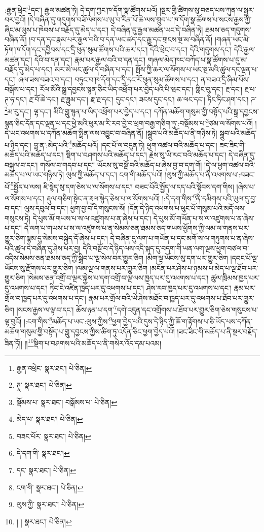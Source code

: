 :རྒྱན་ཕྲེང་\footnote{རྒྱན་འཕྲེང་  སྣར་ཐང་།  པེ་ཅིན། }དང་། རྒྱལ་མཚན་ཏེ། དེ་དག་ཀྱང་ཁ་དོག་སྣ་ཚོགས་པའོ། །སྔར་གྱི་ཚིགས་སུ་བཅད་པས་ཀུན་ལ་སྦྱར་བར་བྱའོ། །དེ་བཞིན་དུ་གདུགས་བཟོ་ལེགས་པ་ཡུ་བ་རིན་པོ་ཆེ་ལས་གྲུབ་པ་ཁ་དོག་སྣ་ཚོགས་པ་སངས་རྒྱས་ཀྱི་ཞིང་མ་ལུས་པ་ཁེབས་པ་བརྗོད་དུ་མེད་པ་དང་། དེ་བཞིན་དུ་རྒྱལ་མཚན་ཡང་དེ་བཞིན་ཏེ། ཐམས་ཅད་གདུགས་བཞིན་ནོ། །བ་དན་དང་རྣམ་པར་རྒྱལ་བའི་བ་དན་ཡང་ཚད་དང་རྒྱུ་དང་གྲངས་སྔ་མ་བཞིན་ནོ། །གཞན་ཡང་མེ་ཏོག་ཁ་དོག་དང་དབྱིབས་དང་དྲི་ཕུན་སུམ་ཚོགས་པའི་ཆར་དང་། དེའི་ཕྲེང་བ་དང་། དེའི་གདུགས་དང་། དེའི་རྒྱལ་མཚན་དང་། དེའི་བ་དན་དང་། རྣམ་པར་རྒྱལ་བའི་བ་དན་དང་། གཞལ་མེད་ཁང་བཀོད་པ་སྣ་ཚོགས་པ་དུ་མ་བརྗོད་དུ་མེད་པ་དང་། མར་མེ་ཡང་ཚུལ་དེ་བཞིན་པ་དང་། སྤོས་ཀྱི་ཆར་ལ་སོགས་པ་ཡང་སྔ་མའི་ཚུལ་དང་ལྡན་པ་དང་། ཞལ་ཟས་བཟའ་བ་དང་། བཏུང་བ་ཁ་དོག་དང་དྲི་དང་རོ་ཕུན་སུམ་ཚོགས་པ་དང་། ན་བཟའ་དྲི་ཞིམ་པོས་བསྒོས་པ་དང་། རོལ་མོའི་སྒྲ་དབྱངས་སྙན་ཅིང་ཡིད་འཕྲོག་པར་བྱེད་པའི་པི་ཝང་དང་། གླིང་བུ་དང་། རྔ་དང་། རྔ་པ་ཊ་ཧ་དང་། རྔ་བོ་ཆེ་དང་། རྔ་ཟླུམ་དང་། རྫ་རྔ་དང་། དུང་དང་། ཟངས་དུང་དང་། ཆ་ལང་དང་། ཏིང་ཏིང་ཤག་དང་། ཌ་\footnote{ཊཱ་  སྣར་ཐང་།  པེ་ཅིན། }མ་རུ་དང་། ལྷ་དང་། མིའི་གླུ་སྙན་པ་ཡིད་འཕྲོག་པར་བྱེད་པ་དང་། དཀོན་མཆོག་གསུམ་གྱི་བསྟོད་པའི་སྒྲ་དབྱངས་སྙན་ཅིང་དོན་དང་ལྡན་པ་དང་ཕྱེ་མའི་ཕུར་མ་རི་རབ་བྱེ་བ་ཕྲག་བརྒྱ་གཅིག་ཏུ་:བསྡོམས་པ་\footnote{སྡོམས་པ་  སྣར་ཐང་། བསྒོམས་པ་  པེ་ཅིན། }ཙམ་ལ་སོགས་པའོ། །དེ་ཡང་འཕགས་པ་དཀོན་མཆོག་སྤྲིན་ལས་འབྱུང་བ་བཞིན་ནོ། །སྒྲུབ་པའི་མཆོད་པ་ནི་གཉིས་ཏེ། སྒྲུབ་པའི་མཆོད་པ་ཉིད་དང་། བླ་ན་:མེད་པའི་\footnote{མེད་པ་  སྣར་ཐང་།  པེ་ཅིན། }མཆོད་པའོ། །དང་པོ་ལ་བདུན་ཏེ། ཕྱག་འཚལ་བའི་མཆོད་པ་དང་། ཟང་ཟིང་གི་མཆོད་པའི་མཆོད་པ་དང་། སྡིག་པ་བཤགས་པའི་མཆོད་པ་དང་། རྗེས་སུ་ཡི་རང་བའི་མཆོད་པ་དང་། དེ་བཞིན་དུ་བསྐུལ་བ་དང་། གསོལ་བ་གདབ་པ་དང་། ཡོངས་སུ་བསྔོ་བའི་མཆོད་པ་ཞེས་བྱ་བ་དག་གོ། །དེ་ལ་ཕྱག་འཚལ་བའི་མཆོད་པ་ལ་ཡང་གཉིས་ཏེ། ལུས་ཀྱི་མཆོད་པ་དང་། ངག་གི་མཆོད་པའོ། །ལུས་ཀྱི་མཆོད་པ་ནི་འཕགས་པ་:བཟང་པོ་\footnote{བཟང་པོར་  སྣར་ཐང་།  པེ་ཅིན། }སྤྱོད་པ་ལས། ཇི་སྙེད་སུ་དག་ཅེས་པ་ལ་སོགས་པ་དང་། བཟང་པོའི་སྤྱོད་ལ་དད་པའི་སྟོབས་དག་གིས། །ཞེས་པ་ལ་སོགས་པ་དང་། རྡུལ་གཅིག་སྟེང་ན་རྡུལ་སྙེད་ཅེས་པ་ལ་སོགས་པའོ། །:དེ་དག་གིས་\footnote{དེ་དག་གི་  སྣར་ཐང་། }ནི་དམིགས་པའི་ཡུལ་དུ་བྱ་བ་དང་། ལུས་དབུལ་བ་དང་། ཕྱག་བྱ་བ་དེ་གསུངས་སོ། །དོན་དེ་ཉིད་འཕགས་པ་ཕུང་པོ་གསུམ་པའི་མདོ་ལས་གསུངས་ཏེ། དེ་པུས་མོ་གཡས་པ་ས་ལ་འཛུགས་པ་ན་ཞེས་པ་དང་། དེ་པུས་མོ་གཡོན་པ་ས་ལ་འཛུགས་པ་ན་ཞེས་པ་དང་། དེ་ལག་པ་གཡས་པ་ས་ལ་འཛུགས་པ་ན་སེམས་ཅན་ཐམས་ཅད་གཡས་ཕྱོགས་ཀྱི་ལམ་ལ་གནས་པར་གྱུར་ཅིག་སྙམ་དུ་སེམས་བསྐྱེད་དོ་ཞེས་པ་དང་། དེ་བཞིན་དུ་ལག་པ་གཡོན་པ་དང་མགོ་ས་ལ་གཏུགས་པ་ན་ཞེས་པའི་ཚུལ་དེ་བཞིན་དུ་ཤེས་པར་བྱ། དེའི་བསྔོ་བ་དེ་ཉིད་ལས་འདི་སྐད་དུ་བདག་གི་ཡན་ལག་ལྔས་ཕྱག་བཙལ་བ་འདིས་སེམས་ཅན་ཐམས་ཅད་ཀྱི་སྒྲིབ་པ་ལྔ་སེལ་བར་གྱུར་ཅིག །མིག་ལྔ་ཡོངས་སུ་དག་པར་གྱུར་ཅིག །དབང་པོ་ལྔ་ཡོངས་སུ་རྫོགས་པར་གྱུར་ཅིག །ལམ་ལྔ་ལ་གནས་པར་གྱུར་ཅིག །མངོན་པར་ཤེས་པ་ཉམས་པ་མེད་པ་ལྔ་ཐོབ་པར་གྱུར་ཅིག །སེམས་ཅན་འགྲོ་བ་ལྔར་སྐྱེས་པ་དག་འགྲོ་བ་ལྔ་ལས་ཁྱད་པར་དུ་འཕགས་པ་དང་། ཚུལ་ཁྲིམས་ཁྱད་པར་དུ་འཕགས་པ་དང་། ཏིང་ངེ་འཛིན་ཁྱད་པར་དུ་འཕགས་པ་དང་། ཤེས་རབ་ཁྱད་པར་དུ་འཕགས་པ་དང་། རྣམ་པར་གྲོལ་བ་ཁྱད་པར་དུ་འཕགས་པ་དང་། རྣམ་པར་གྲོལ་བའི་ཡེ་ཤེས་མཐོང་བ་ཁྱད་པར་དུ་འཕགས་པ་ཐོབ་པར་གྱུར་ཅིག །སངས་རྒྱས་ལ་ལྟ་བ་དང་། ཆོས་ཉན་པ་དག་\footnote{དང་  སྣར་ཐང་།  པེ་ཅིན། }དགེ་འདུན་དང་འགྲོགས་པ་ཐོབ་པར་གྱུར་ཅིག་ཅེས་གསུངས་པ་ལྟ་བུའོ། །:ངག་གིས་\footnote{ངག་གི་  སྣར་ཐང་།  པེ་ཅིན། }མཆོད་པ་ཡང་:ལུས་ཀྱིས་\footnote{ལུས་ཀྱི་  སྣར་ཐང་།  པེ་ཅིན། }ཕྱག་བྱེད་པའི་དུས་དེ་ཉིད་ཀྱི་ཆོ་ག་རྟོགས་པ་ཅི་ཡོད་པས་དཀོན་མཆོག་གསུམ་གྱི་བསྟོད་པ་གླུ་དབྱངས་ཀྱིས་ཚིག་ཏུ་འདོན་ཅིང་ཕྱག་བྱེད་པའོ། །ཟང་ཟིང་གི་མཆོད་པ་ནི་སྔར་བརྗོད་ཟིན་ཏོ།། །།\footnote{། །  སྣར་ཐང་།  པེ་ཅིན། }སྡིག་པ་བཤགས་པའི་མཆོད་པ་ནི་གསེར་འོད་དམ་པའམ། 